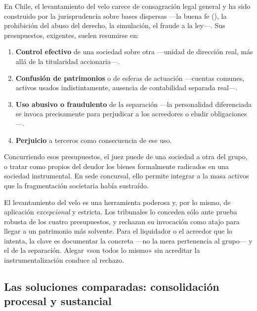 En Chile, el levantamiento del velo carece de consagración legal general y ha sido construido por la
jurisprudencia sobre bases dispersas ---la buena fe (), la prohibición del abuso del
derecho, la simulación, el fraude a la ley---. Sus presupuestos, exigentes, suelen resumirse en:

\begin{enumerate}
  \item \textbf{Control efectivo} de una sociedad sobre otra ---unidad de dirección real, más allá
  de la titularidad accionaria---.
  \item \textbf{Confusión de patrimonios} o de esferas de actuación ---cuentas comunes, activos
  usados indistintamente, ausencia de contabilidad separada real---.
  \item \textbf{Uso abusivo o fraudulento} de la separación ---la personalidad diferenciada se
  invoca precisamente para perjudicar a los acreedores o eludir obligaciones---.
  \item \textbf{Perjuicio} a terceros como consecuencia de ese uso.
\end{enumerate}

Concurriendo esos presupuestos, el juez puede  de una
sociedad a otra del grupo, o tratar como propios del deudor los bienes formalmente radicados en una
sociedad instrumental. En sede concursal, ello permite integrar a la masa activos que la fragmentación
societaria había sustraído.

\begin{practica}
El levantamiento del velo es una herramienta poderosa y, por lo mismo, de aplicación
\emph{excepcional} y estricta. Los tribunales lo conceden sólo ante prueba robusta de los cuatro
presupuestos, y rechazan su invocación como atajo para llegar a un patrimonio más solvente. Para el
liquidador o el acreedor que lo intenta, la clave es documentar la 
concreta ---no la mera pertenencia al grupo--- y el  de la
separación. Alegar «son todos lo mismo» sin acreditar la instrumentalización conduce al rechazo.
\end{practica}

\bloquePractico

\subsection{Las soluciones comparadas: consolidación procesal y sustancial}

